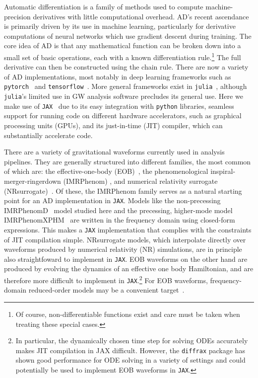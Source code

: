 \documentclass[twocolumn]{aastex631}
\newcommand{\jax}{\texttt{JAX}\xspace}
\begin{document}
Automatic differentiation is a family of methods used to compute machine-precision derivatives with little computational overhead. 
AD's recent ascendance is primarily driven by its use in machine learning, particularly for derivative computations of neural networks which use gradient descent during training.
The core idea of AD is that any mathematical function can be broken down into a small set of basic operations, each with a known differentiation rule.\footnote{
    Of course, non-differentiable functions exist and care must be taken when treating these special cases.
    }
The full derivative can then be constructed using the chain rule.
There are now a variety of AD implementations, most notably in deep learning frameworks such as \texttt{pytorch}~\citep{pytorch} and \texttt{tensorflow}~\citep{tensorflow2015-whitepaper}.
More general frameworks exist in \texttt{julia}~\citep{zygote, forwarddiff}, although \texttt{julia}'s limited use in GW analysis software precludes its general use.
Here we make use of \jax~\citep{jax2018github} due to its easy integration with \texttt{python} libraries, seamless support for running code on different hardware accelerators, such as graphical processing units (GPUs), and its just-in-time (JIT) compiler, which can substantially accelerate code.

There are a variety of gravitational waveforms currently used in analysis pipelines.
They are generally structured into different families, the most common of which are: the effective-one-body (EOB)~\citep{Damour:2008yg,Buonanno:2005xu, Buonanno:2000ef, Buonanno:1998gg, Damour:2000we,Ossokine:2020kjp,Nagar:2021gss,Ramos-Buades:2021adz,Albertini:2021tbt, Cotesta:2020qhw, Bohe:2016gbl}, the phenomenological inspiral-merger-ringerdown (IMRPhenom) \citep{Husa:2015iqa,Khan:2015jqa,Hannam:2013oca,Pratten:2020ceb, Smith:2016qas, Pratten:2020fqn, Garcia-Quiros:2020qpx}, and numerical relativity surrogate (NRsurrogate)~\citep{Blackman:2017pcm,Varma:2018mmi,Varma:2019csw}.
Of these, the IMRPhenom family serves as a natural starting point for an AD implementation in \jax.
Models like the non-precessing IMRPhenomD~\citep{Khan:2015jqa} model studied here and the precessing, higher-mode model IMRPhenomXPHM~\citep{Pratten:2020fqn, Pratten:2020ceb} are written in the frequency domain using closed-form expressions.
This makes a \jax implementation that complies with the constraints of JIT compilation simple.
NRsurrogate models, which interpolate directly over waveforms produced by numerical relativity (NR) simulations, are in principle also straightfoward to implement in \jax.
EOB waveforms on the other hand are produced by evolving the dynamics of an effective one body Hamiltonian, and are therefore more difficult to implement in \jax.\footnote{
    In particular, the dynamically chosen time step for solving ODEs accurately makes JIT compilation in JAX difficult. However, the \texttt{diffrax} package \citep{diffrax} has shown good performance for ODE solving in a variety of settings and could potentially be used to implement EOB waveforms in \jax.
    }
For EOB waveforms, frequency-domain reduced-order models may be a convenient target~\citep[e.g.]{Cotesta:2020qhw}.
\end{document}
